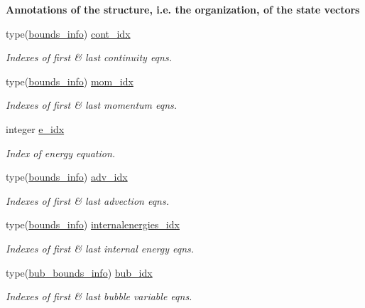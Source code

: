 \begin{Indent}\textbf{ Annotations of the structure, i.\+e. the organization, of the state vectors}\par
\begin{DoxyCompactItemize}
\item 
type(\hyperlink{structm__derived__types_1_1bounds__info}{bounds\+\_\+info}) \hyperlink{namespacem__global__parameters_adefe3b78bf286d73a56aef49880dfb0d}{cont\+\_\+idx}
\begin{DoxyCompactList}\small\item\em Indexes of first \& last continuity eqns. \end{DoxyCompactList}\item 
type(\hyperlink{structm__derived__types_1_1bounds__info}{bounds\+\_\+info}) \hyperlink{namespacem__global__parameters_ad138d35528cf27ff42dba00d13c269be}{mom\+\_\+idx}
\begin{DoxyCompactList}\small\item\em Indexes of first \& last momentum eqns. \end{DoxyCompactList}\item 
integer \hyperlink{namespacem__global__parameters_ac6ef72ca6aa7a22e60c864df25559892}{e\+\_\+idx}
\begin{DoxyCompactList}\small\item\em Index of energy equation. \end{DoxyCompactList}\item 
type(\hyperlink{structm__derived__types_1_1bounds__info}{bounds\+\_\+info}) \hyperlink{namespacem__global__parameters_ae8e6c40b6ec73cb126b0cce7496e0057}{adv\+\_\+idx}
\begin{DoxyCompactList}\small\item\em Indexes of first \& last advection eqns. \end{DoxyCompactList}\item 
type(\hyperlink{structm__derived__types_1_1bounds__info}{bounds\+\_\+info}) \hyperlink{namespacem__global__parameters_aac5ed9f316eeebbe04258bb1120cbea4}{internalenergies\+\_\+idx}
\begin{DoxyCompactList}\small\item\em Indexes of first \& last internal energy eqns. \end{DoxyCompactList}\item 
type(\hyperlink{structm__derived__types_1_1bub__bounds__info}{bub\+\_\+bounds\+\_\+info}) \hyperlink{namespacem__global__parameters_a9a425d1bd91d1765043adf8410b98bf7}{bub\+\_\+idx}
\begin{DoxyCompactList}\small\item\em Indexes of first \& last bubble variable eqns. \end{DoxyCompactList}\item 

\end{DoxyCompactItemize}
\end{Indent}
